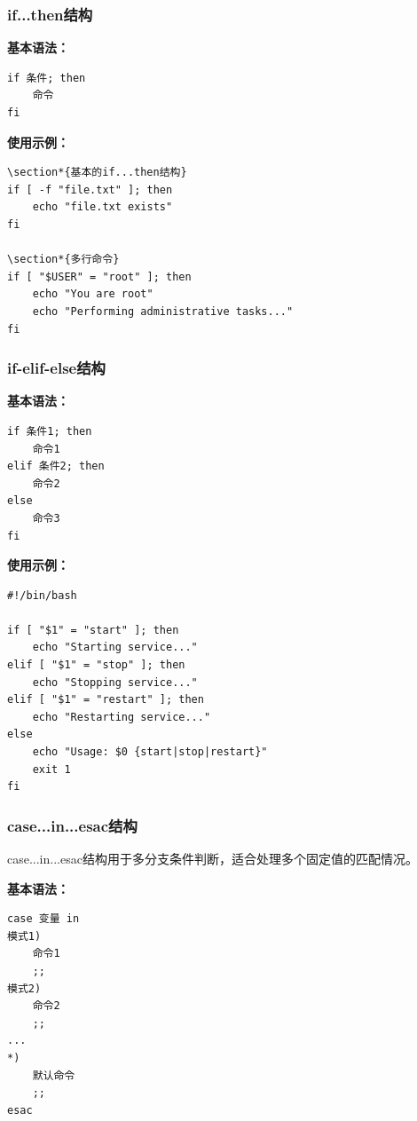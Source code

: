 \documentclass[12pt,UTF8]{ctexbook}
\begin{document}
\subsubsection{if...then结构}
\textbf{基本语法：}
\begin{verbatim}
if 条件; then
    命令
fi
\end{verbatim}

\textbf{使用示例：}
\begin{verbatim}
\section*{基本的if...then结构}
if [ -f "file.txt" ]; then
    echo "file.txt exists"
fi

\section*{多行命令}
if [ "$USER" = "root" ]; then
    echo "You are root"
    echo "Performing administrative tasks..."
fi
\end{verbatim}

\subsubsection{if-elif-else结构}
\textbf{基本语法：}
\begin{verbatim}
if 条件1; then
    命令1
elif 条件2; then
    命令2
else
    命令3
fi
\end{verbatim}

\textbf{使用示例：}
\begin{verbatim}
#!/bin/bash

if [ "$1" = "start" ]; then
    echo "Starting service..."
elif [ "$1" = "stop" ]; then
    echo "Stopping service..."
elif [ "$1" = "restart" ]; then
    echo "Restarting service..."
else
    echo "Usage: $0 {start|stop|restart}"
    exit 1
fi
\end{verbatim}

\subsubsection{case...in...esac结构}
case...in...esac结构用于多分支条件判断，适合处理多个固定值的匹配情况。

\textbf{基本语法：}
\begin{verbatim}
case 变量 in
模式1)
    命令1
    ;;
模式2)
    命令2
    ;;
...
*)
    默认命令
    ;;
esac
\end{verbatim}
\end{document}
